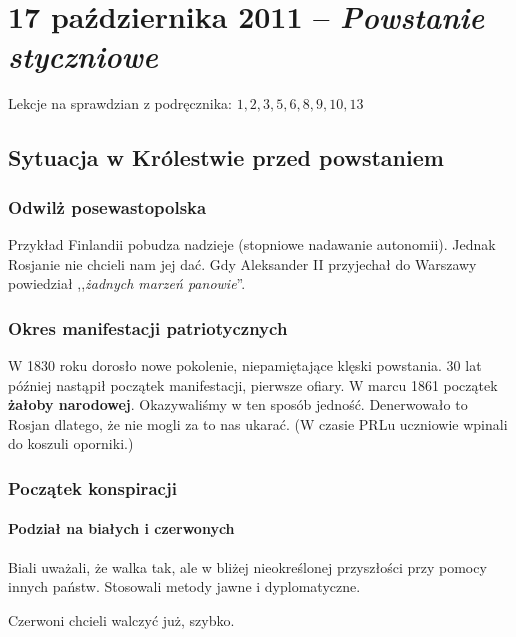 \documentclass [a4paper, 11pt, oneside]{book}
\begin{document}
\chapter{17 października 2011 -- \textit{Powstanie styczniowe}} %
\label{cha:17_pa_dziernika_2011_textit}
    Lekcje na sprawdzian z podręcznika: $1,2,3,5,6,8,9,10,13$

    \section{Sytuacja w Królestwie przed powstaniem} %
    \label{sec:sytuacja_w_kr_lestwie_przed_powstaniem}
        \subsection{Odwilż posewastopolska} %
        \label{sub:odwil_posewastopolska}
            Przykład Finlandii pobudza nadzieje (stopniowe nadawanie autonomii). Jednak Rosjanie nie chcieli nam jej dać. Gdy Aleksander II przyjechał do Warszawy powiedział ,,\emph{żadnych marzeń panowie}''.
        \subsection{Okres manifestacji patriotycznych} %
        \label{sub:okres_manifestacji_patriotycznych}
            W 1830 roku dorosło nowe pokolenie, niepamiętające klęski powstania. 30 lat później nastąpił początek manifestacji, pierwsze ofiary. W marcu 1861 początek \textbf{żałoby narodowej}. Okazywaliśmy w ten sposób jedność. Denerwowało to Rosjan dlatego, że nie mogli za to nas ukarać. (W czasie PRLu uczniowie wpinali do koszuli oporniki.)
        \subsection{Początek konspiracji} %
        \label{sub:subsection_name}
            \subsubsection{Podział na białych i czerwonych} %
            \label{ssub:podzia_na_bia_ych_i_czarnych}
                Biali uważali, że walka tak, ale w bliżej nieokreślonej przyszłości przy pomocy innych państw. Stosowali metody jawne i dyplomatyczne.

                Czerwoni chcieli walczyć już, szybko.
\end{document}
